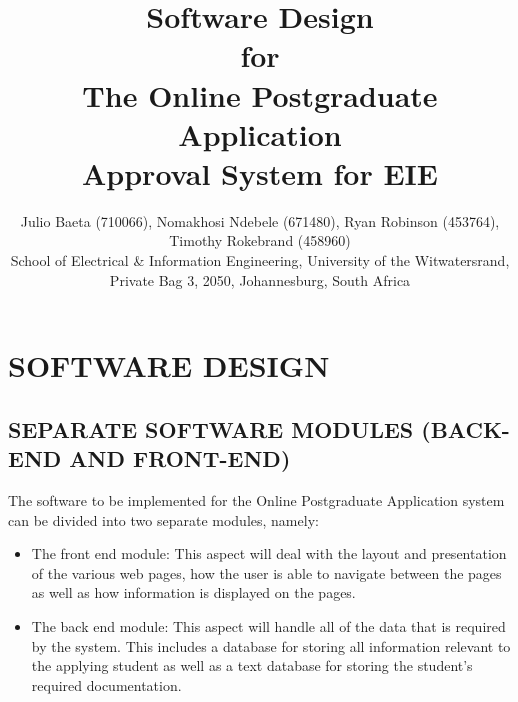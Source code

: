 \documentclass[journal,comsoc,onecolumn]{IEEEtran}
\begin{document}

\title{Software Design \\ \vspace{7mm} for \\ \vspace{7mm} The Online Postgraduate Application \\ Approval System for EIE}

\author{\vspace{3mm} Julio Baeta (710066), Nomakhosi Ndebele (671480), Ryan Robinson (453764), Timothy Rokebrand (458960)\\ \small \vspace{2mm} School of Electrical \& Information Engineering, University of the Witwatersrand, Private Bag 3, 2050, Johannesburg, South Africa}

\markboth{}{}

\maketitle

\thispagestyle{empty}


\newpage

\thispagestyle{empty}

\section{SOFTWARE DESIGN}


\subsection{SEPARATE SOFTWARE MODULES (BACK-END AND FRONT-END)}
The software to be implemented for the Online Postgraduate Application system can be divided into two separate modules, namely:

\begin{itemize}
	\item The front end module: This aspect will deal with the layout and presentation of the various web pages, how the user is able to navigate between the pages as well as how information is displayed on the pages.
	\item The back end module: This aspect will handle all of the data that is required by the system. This includes a database for storing all information relevant to the applying student as well as a text database for storing the student's required documentation.
\end{itemize}
\end{document}
